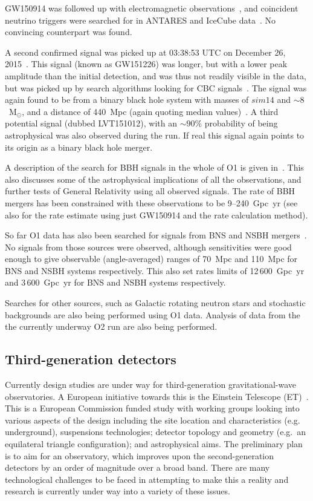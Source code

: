 GW150914 was followed up with electromagnetic observations~\cite{2016ApJ...826L..13A}, and coincident neutrino triggers were searched
for in ANTARES and IceCube data~\cite{2016PhRvD..93l2010A}. No convincing counterpart was found.

A second confirmed signal was picked up at 03:38:53 UTC on December 26, 2015~\cite{GW151226}. This signal (known as GW151226)
was longer, but with a lower peak amplitude than the initial detection, and was thus not readily visible in the data, but
was picked up by search algorithms looking for CBC signals~\cite{2016arXiv160404324M}. The signal was again found
to be from a binary black hole system with masses of $sim 14$ and $\sim 8$~M$_{\odot}$, and a distance of 440~Mpc (again quoting
median values)~\cite{GW151226}. A third potential signal (dubbed LVT151012), with an $\sim 90\%$ probability of being astrophysical was
also observed during the run. If real this signal again points to its origin as a binary black hole merger. 

A description of the search for BBH signals in the whole of O1 is given in~\cite{2016PhRvX...6d1015A}. This also discusses some of the
astrophysical implications of all the observations, and further tests of General Relativity using all observed signals. The rate of
BBH mergers has been constrained with these observations to be 9--240~Gpc~yr (see also \cite{rates, ratessup} for the rate
estimate using just GW150914 and the rate calculation method).

So far O1 data has also been searched for signals from BNS and NSBH mergers~\cite{2016ApJ...832L..21A}. No signals from
those sources were observed, although sensitivities were good enough to give observable (angle-averaged) ranges of 70~Mpc
and 110~Mpc for BNS and NSBH systems respectively. This also set rates limits of 12\,600~Gpc~yr and
3\,600~Gpc~yr for BNS and NSBH systems respectively.

Searches for other sources, such as Galactic rotating neutron stars and stochastic backgrounds are also being performed using
O1 data. Analysis of data from the the currently underway O2 run are also being performed.

\subsection{Third-generation detectors}
\label{subsec:et} 

Currently design studies are under way for third-generation gravitational-wave
observatories. A European initiative towards this is the Einstein Telescope (ET)~\cite{ETweb}. This is a European
Commission funded study with working groups looking into various aspects of the
design including the site location and characteristics (e.g.\, underground),
suspensions technologies; detector topology and geometry (e.g.\, an equilateral
triangle configuration); and astrophysical aims. The preliminary plan is to
aim for an observatory, which improves upon the second-generation detectors by
an order of magnitude over a broad band. There are many technological challenges
to be faced in attempting to make this a reality and research is currently under
way into a variety of these issues.

